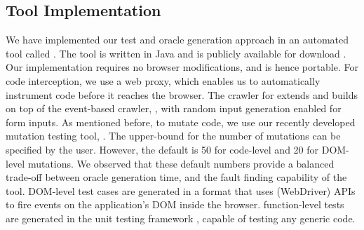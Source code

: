 \subsection{Tool Implementation} \label{Sec:tool}
We have implemented our \javascript test and oracle generation approach in an automated tool called \jseft. The tool is written in Java and is publicly available for download \cite{jseft-dl}. Our implementation requires no browser modifications, and is hence portable. For \javascript code interception, we use a web proxy, which enables us to automatically instrument \javascript code before it reaches the browser. 
The crawler for \jseft extends and builds on top of the  event-based crawler, \crawljax \cite{mesbah:tweb11}, with random input generation enabled for  form inputs.
%
As mentioned before, to mutate \javascript code, we use our recently developed mutation testing tool, \mutandis \cite{mirshokraie:icst13}. The upper-bound for the number of mutations can be specified by the 
user. However, the default is 50 for code-level and 20 for DOM-level mutations. We observed that these default numbers  provide a balanced trade-off between oracle generation time, and the fault finding capability of the tool. %
%
DOM-level test cases are generated in a \junit format that uses \selenium (WebDriver) APIs to fire events on the application's DOM inside the browser. \javascript function-level tests are generated in the \qunit unit testing framework \cite{quint}, capable of testing any generic \javascript code. 

